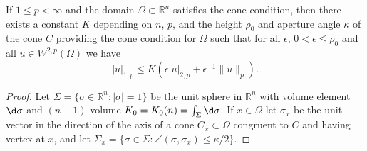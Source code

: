 \begin{lemma}
  If $1\leq p<\infty$ and the domain $\Omega\subset\mathbb{R}^n$ satisfies
  the cone condition, then there exists a constant $K$ depending on $n$, $p$,
  and the height $\rho_0$ and aperture angle $\kappa$ of the cone $C$ providing
  the cone condition for $\Omega$ such that for all $\epsilon$, $0<\epsilon\leq\rho_0$
  and all $u\in W^{2,p}(\Omega)$ we have
  \begin{equation}\label{eq:5.5}
    |u|_{1,p} \leq K (\epsilon |u|_{2,p} + \epsilon^{-1} \|u\|_p).
  \end{equation}
\end{lemma}

\begin{proof}
  Let $\Sigma = \{\sigma\in \mathbb{R}^n : |\sigma|=1\}$ be the unit sphere
  in $\mathbb{R}^n$ with volume element $\d\sigma$ and $(n-1)$-volume
  $K_0 = K_0(n) = \int_\Sigma \d\sigma$. If $x\in\Omega$ let $\sigma_x$
  be the unit vector in the direction of the axis of a cone $C_x\subset\Omega$
  congruent to $C$ and having vertex at $x$, and let $\Sigma_x = \{\sigma\in\Sigma:
  \angle (\sigma,\sigma_x)\leq\kappa/2\}$.


\end{proof}
